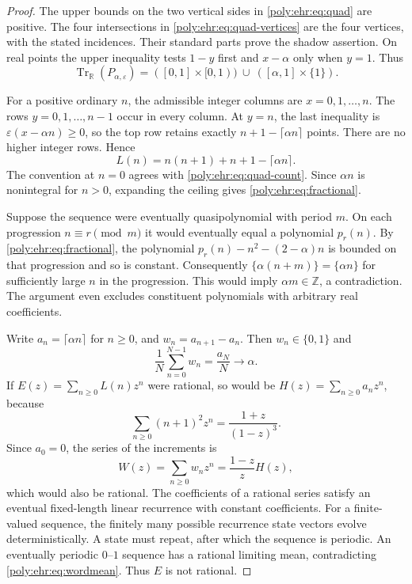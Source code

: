 \documentclass[11pt,a4paper]{article}
\numberwithin{equation}{section}
\theoremstyle{plain}
\newcommand{\R}{\mathbb R}
\newcommand{\Z}{\mathbb Z}
\newcommand{\eps}{\varepsilon}
\newcommand{\Tr}{\operatorname{Tr}_{\R}}%
\newcommand{\tr}{\operatorname{tr}}%
\begin{document}
\begin{proof}
The upper bounds on the two vertical sides in \eqref{poly:ehr:eq:quad} are positive.
The four intersections in \eqref{poly:ehr:eq:quad-vertices} are the four vertices,
with the stated incidences. Their standard parts prove the shadow assertion.
On real points the upper inequality tests $1-y$ first and $x-\alpha$ only
when $y=1$. Thus
\begin{equation}\label{poly:ehr:eq:quad-trace}
 \Tr(P_{\alpha,\eps})=
 ([0,1]\times[0,1))\ \cup\ ([\alpha,1]\times\{1\}).
\end{equation}

For a positive ordinary $n$, the admissible integer columns are
$x=0,1,\ldots,n$. The rows $y=0,1,\ldots,n-1$ occur in every column.
At $y=n$, the last inequality is $\eps(x-\alpha n)\geq0$, so the top row
retains exactly $n+1-\lceil\alpha n\rceil$ points. There are no higher
integer rows. Hence
\[
 L(n)=n(n+1)+n+1-\lceil\alpha n\rceil.
\]
The convention at $n=0$ agrees with \eqref{poly:ehr:eq:quad-count}. Since $\alpha n$
is nonintegral for $n>0$, expanding the ceiling gives
\eqref{poly:ehr:eq:fractional}.

Suppose the sequence were eventually quasipolynomial with period $m$.
On each progression $n\equiv r\pmod m$ it would eventually equal a
polynomial $p_r(n)$. By \eqref{poly:ehr:eq:fractional}, the polynomial
$p_r(n)-n^2-(2-\alpha)n$ is bounded on that progression and so is constant.
Consequently $\{\alpha(n+m)\}=\{\alpha n\}$ for sufficiently large $n$
in the progression. This would imply $\alpha m\in\Z$, a contradiction.
The argument even excludes constituent polynomials with arbitrary real
coefficients.

Write $a_n=\lceil\alpha n\rceil$ for $n\geq0$, and
$w_n=a_{n+1}-a_n$. Then $w_n\in\{0,1\}$ and
\begin{equation}\label{poly:ehr:eq:wordmean}
 \frac1N\sum_{n=0}^{N-1}w_n=\frac{a_N}{N}\longrightarrow\alpha.
\end{equation}
If $E(z)=\sum_{n\geq0}L(n)z^n$ were rational, so would be
$H(z)=\sum_{n\geq0}a_nz^n$, because
\[
 \sum_{n\geq0}(n+1)^2z^n=\frac{1+z}{(1-z)^3}.
\]
Since $a_0=0$, the series of the increments is
\[
 W(z)=\sum_{n\geq0}w_nz^n=\frac{1-z}{z}H(z),
\]
which would also be rational. The coefficients of a rational series satisfy
an eventual fixed-length linear recurrence with constant coefficients.
For a finite-valued sequence, the finitely many possible recurrence state
vectors evolve deterministically. A state must repeat, after which the
sequence is periodic. An eventually periodic $0$--$1$ sequence has a
rational limiting mean, contradicting \eqref{poly:ehr:eq:wordmean}. Thus $E$ is
not rational.


\end{proof}
\end{document}
